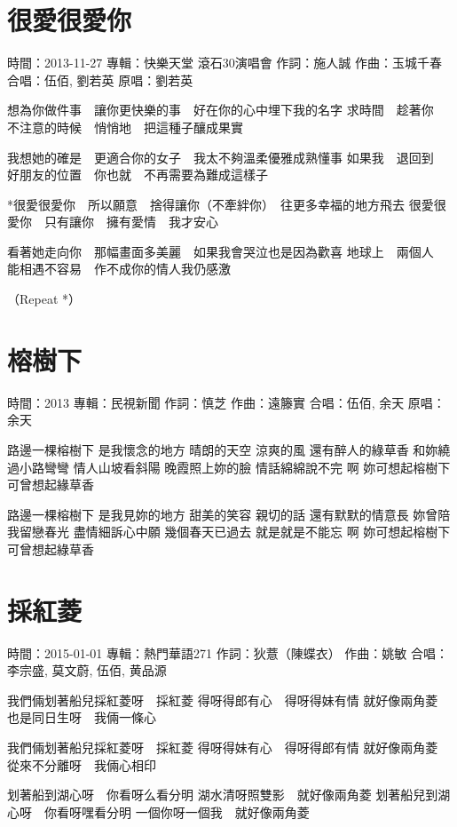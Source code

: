 \documentclass[UTF8,a4paper,oneside,twocolumn,12pt]{ctexbook}
\newcommand{\infopair}[2]{\textbullet #1：#2}
\newcommand{\zc}[1][伍佰]{\infopair{作詞}{#1}}
\newcommand{\zq}[1][伍佰]{\infopair{作曲}{#1}}
\newcommand{\zj}[1]{\infopair{專輯}{#1}}
\newcommand{\yc}[1]{\infopair{原唱}{#1}}
\newcommand{\sj}[1]{\infopair{時間}{#1}}
\newenvironment{info}{\begin{flushleft}\kaishu
	}
	{\end{flushleft}\normalsize\yahei\par}
\newenvironment{lyric}{
	}
{}
\begin{document}
\section{很愛很愛你}
\begin{info}
	\sj{2013-11-27}
	\zj{快樂天堂 滾石30演唱會}
	\zc[施人誠]
	\zq[玉城千春]
	\infopair{合唱}{伍佰, 劉若英}
	\yc{劉若英}
\end{info}
\begin{lyric}
	想為你做件事　讓你更快樂的事　好在你的心中埋下我的名字
	求時間　趁著你　不注意的時候　悄悄地　把這種子釀成果實

	我想她的確是　更適合你的女子　我太不夠溫柔優雅成熟懂事
	如果我　退回到　好朋友的位置　你也就　不再需要為難成這樣子

	*很愛很愛你　所以願意　捨得讓你（不牽絆你）　往更多幸福的地方飛去
	很愛很愛你　只有讓你　擁有愛情　我才安心

	看著她走向你　那幅畫面多美麗　如果我會哭泣也是因為歡喜
	地球上　兩個人　能相遇不容易　作不成你的情人我仍感激

	（Repeat *）
\end{lyric}

\section{榕樹下} %
\begin{info}
	\sj{2013}
	\zj{民視新聞}
	\zc[慎芝]
	\zq[遠籐實]
	\infopair{合唱}{伍佰, 余天}
	\yc{余天}
\end{info}
\begin{lyric}
	路邊一棵榕樹下 是我懷念的地方
	晴朗的天空 涼爽的風
	還有醉人的綠草香
	和妳繞過小路彎彎 情人山坡看斜陽
	晚霞照上妳的臉 情話綿綿說不完 啊
	妳可想起榕樹下 可曾想起緣草香

	路邊一棵榕樹下 是我見妳的地方
	甜美的笑容 親切的話 還有默默的情意長
	妳曾陪我留戀春光 盡情細訴心中願
	幾個春天已過去 就是就是不能忘
	啊 妳可想起榕樹下 可曾想起綠草香
\end{lyric}

\section{採紅菱}
\begin{info}
	\sj{2015-01-01}
	\zj{熱門華語271}
	\zc[狄薏（陳蝶衣）]
	\zq[姚敏]
	\infopair{合唱}{李宗盛, 莫文蔚, 伍佰, 黄品源}
\end{info}
\begin{lyric}
	我們倆划著船兒採紅菱呀　採紅菱
	得呀得郎有心　得呀得妹有情
	就好像兩角菱　也是同日生呀　我倆一條心

	我們倆划著船兒採紅菱呀　採紅菱
	得呀得妹有心　得呀得郎有情
	就好像兩角菱　從來不分離呀　我倆心相印

	划著船到湖心呀　你看呀么看分明
	湖水清呀照雙影　就好像兩角菱
	划著船兒到湖心呀　你看呀嘿看分明
	一個你呀一個我　就好像兩角菱
\end{lyric}
\end{document}
